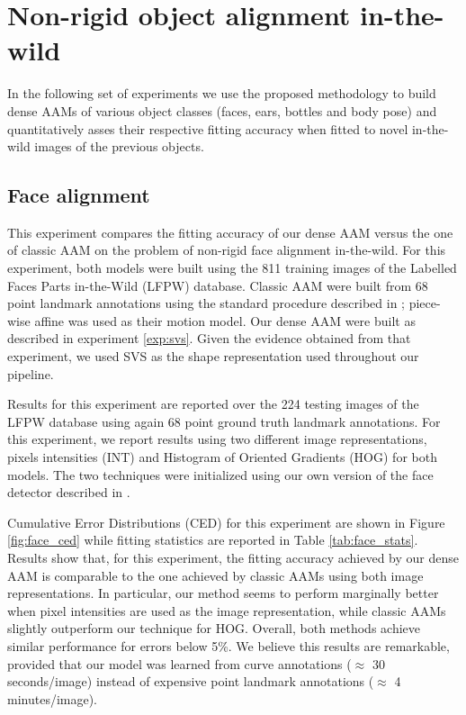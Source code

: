 \section{Non-rigid object alignment in-the-wild}
\label{exp:alignment}

In the following set of experiments we use the proposed methodology to build dense AAMs of various object classes (faces, ears, bottles and body pose) and quantitatively asses their respective fitting accuracy when fitted to novel in-the-wild images of the previous objects.

\subsection{Face alignment}
\label{exp:face}

This experiment compares the fitting accuracy of our dense AAM versus the one of classic AAM on the problem of non-rigid face alignment in-the-wild. For this experiment, both models were built using the 811 training images of the Labelled Faces Parts in-the-Wild (LFPW) \cite{Belhumeur2011} database. Classic AAM were built from 68 point landmark annotations using the standard procedure described in \cite{Cootes2001, Matthews2004}; piece-wise affine was used as their motion model. Our dense AAM were built as described in experiment \ref{exp:svs}. Given the evidence obtained from that experiment, we used SVS as the shape representation used throughout our pipeline.

Results for this experiment are reported over the 224 testing images of the LFPW database using again 68 point ground truth landmark annotations. For this experiment, we report results using two different image representations, \ie pixels intensities (INT) and Histogram of Oriented Gradients (HOG) \cite{Dalal2005} for both models. The two techniques were initialized using our own version of the face detector described in \cite{Zhu2012}.

Cumulative Error Distributions (CED) for this experiment are shown in Figure \ref{fig:face_ced} while fitting statistics are reported in Table \ref{tab:face_stats}. Results show that, for this experiment, the fitting accuracy achieved by our dense AAM is comparable to the one achieved by classic AAMs using both image representations. In particular, our method seems to perform marginally better when pixel intensities are used as the image representation, while classic AAMs slightly outperform our technique for HOG. Overall, both methods achieve similar performance for errors below 5\%. We believe this results are remarkable, provided that our model was learned from curve annotations ($\approx$ 30 seconds/image) instead of expensive point landmark annotations ($\approx$ 4 minutes/image).

